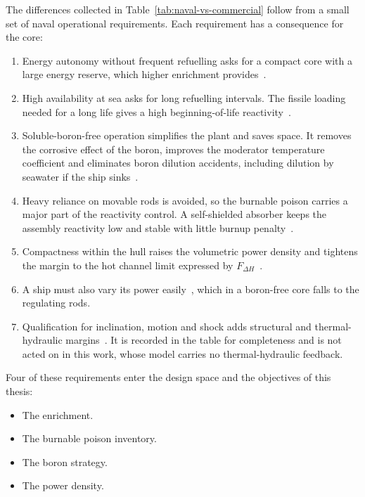 The differences collected in Table~\ref{tab:naval-vs-commercial} follow
from a small set of naval operational requirements. Each requirement
has a consequence for the core:

\begin{enumerate}
  \item Energy autonomy without frequent refuelling asks for a compact
        core with a large energy reserve, which higher enrichment
        provides~\cite{ippolito_1990}.

  \item High availability at sea asks for long refuelling intervals. The
        fissile loading needed for a long life gives a high
        beginning-of-life reactivity~\cite{alam_partI_2019}.

  \item Soluble-boron-free operation simplifies the plant and saves
        space. It removes the corrosive effect of the boron, improves the
        moderator temperature coefficient and eliminates boron dilution
        accidents, including dilution by seawater if the ship
        sinks~\cite{alam_partI_2019}.

  \item Heavy reliance on movable rods is avoided, so the burnable poison
        carries a major part of the reactivity control. A self-shielded
        absorber keeps the assembly reactivity low and stable with little
        burnup penalty~\cite{alam_partI_2019}.

  \item Compactness within the hull raises the volumetric power density
        and tightens the margin to the hot channel limit expressed by
        $F_{\Delta H}$~\cite{alam_2019_hotchannel}.

  \item A ship must also vary its power easily~\cite{alam_partI_2019},
        which in a boron-free core falls to the regulating rods.

  \item Qualification for inclination, motion and shock adds structural
        and thermal-hydraulic margins~\cite{ritm200n_nei_2024}. It is
        recorded in the table for completeness and is not acted on in
        this work, whose model carries no thermal-hydraulic feedback.
\end{enumerate}

Four of these requirements enter the design space and the objectives of
this thesis:

\begin{itemize}
  \item The enrichment.

  \item The burnable poison inventory.

  \item The boron strategy.

  \item The power density.
\end{itemize}

